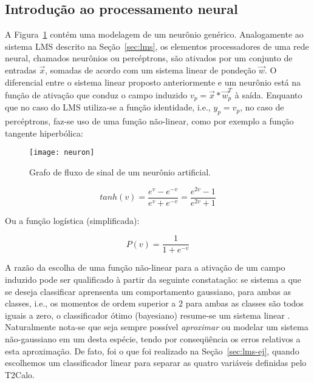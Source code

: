 \subsection{Introdução ao processamento neural}

A Figura~\ref{fig:neuron} contém uma modelagem de um neurônio
genérico. Analogamente ao sistema LMS descrito na Seção~\ref{sec:lms}, os
elementos processadores de uma rede neural, chamados neurônios ou percéptrons,
são ativados por um conjunto de entradas $\overrightarrow{x}$, somadas de
acordo com um sistema linear de pondeção $\overrightarrow{w}$. O diferencial
entre o sistema linear proposto anteriormente e um neurônio está na função de
ativação que conduz o campo induzido $v_p =
\overrightarrow{x}*\overrightarrow{w}_{p}^{T}$ à saída. Enquanto que
no caso do LMS utiliza-se a função identidade, i.e., $y_p = v_p$, no caso de
percéptrons, faz-se uso de uma função não-linear, como por exemplo a função
tangente hiperbólica:

\begin{figure}
\begin{center}
\texttt{[image: neuron]}
\end{center}
\caption{Grafo de fluxo de sinal de um neurônio artificial.}
\label{fig:neuron}
\end{figure}

\begin{equation}
tanh(v) = \frac{e^v - e^{-v}}{e^v + e^{-v}} = \frac{e^{2v} - 1}{e^{2v} + 1}
\label{eq:tanh}
\end{equation}

Ou a função logística (simplificada):

\begin{equation}
P(v) = \frac{1}{1 + e^{-v}}
\label{eq:logf}
\end{equation}

A razão da escolha de uma função não-linear para a ativação de um campo
induzido pode ser qualificado à partir da seguinte constatação: se sistema a
que se deseja classificar aprensenta um comportamento gaussiano, para ambas as
classes, i.e., os momentos de ordem superior a $2$ para ambas as classes são
todos iguais a zero, o classificador ótimo (bayesiano) resume-se um sistema
linear \cite{haykin}. Naturalmente nota-se que seja sempre possível
\textit{aproximar} ou modelar um sistema não-gaussiano em um desta espécie,
tendo por conseqüência os erros relativos a esta aproximação. De fato, foi o
que foi realizado na Seção~\ref{sec:lms-ej}, quando escolhemos um
classificador linear para separar as quatro variáveis definidas pelo T2Calo.

